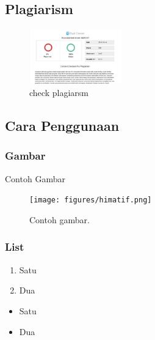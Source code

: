\subsection{Plagiarism}
	\begin{figure}[H]
	\includegraphics[width=4cm]{figures/Tugas1/1174083/plagiarsm.jpg}
	\centering
	\caption{check plagiarsm}
	\end{figure}

\subsection{Cara Penggunaan}
\subsubsection{Gambar}

\hfill\break

Contoh Gambar
\begin{figure}[H]
	\texttt{[image: figures/himatif.png]}
	\centering
	\caption{Contoh gambar.}
\end{figure}

\subsubsection{List}
\begin{enumerate}
	\item Satu
	\item Dua
\end{enumerate}

\begin{itemize}
	\item Satu
	\item Dua
\end{itemize}

